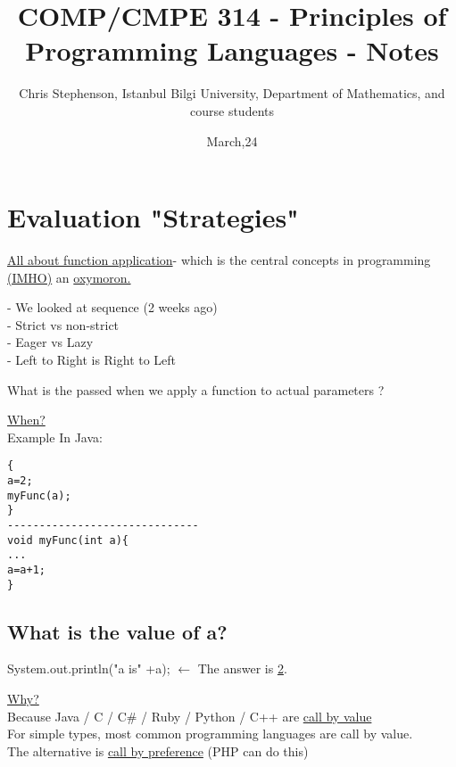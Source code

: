 \documentclass{article}
\begin{document}
\title{COMP/CMPE 314 - Principles of Programming Languages - Notes}
\author{Chris Stephenson, Istanbul Bilgi University, Department of Mathematics, and course students}
\date{March,24}
\maketitle

\section*{Evaluation "Strategies"}
\begin{flushleft}
\underline{All about function application}- which is the central concepts in programming \underline{(IMHO)} an \underline{oxymoron.} 
\end{flushleft}

\doublespacing
\begin{flushleft}
- We looked at sequence (2 weeks ago)\\
- Strict vs non-strict\\
- Eager vs Lazy\\
- Left to Right is Right to Left\\
\end{flushleft}

\doublespacing
\begin{flushleft}
What is the passed when we apply a function to actual parameters ?
\end{flushleft}

\doublespacing
\begin{flushleft}
\underline{When?}\\
Example In Java: 
\begin{verbatim}
{ 
a=2;
myFunc(a);
}
------------------------------
void myFunc(int a){
...
a=a+1;
}
\end{verbatim}
\end{flushleft}

\subsection*{What is the value of a?}
\begin{flushleft}
System.out.println("a is" +a); $\leftarrow$ The answer is \underline{2}.
\end{flushleft}

\doublespacing
\begin{flushleft}
\underline{Why?}\\
Because Java / C / C\# / Ruby / Python / C++ are \underline{call by value}\\
For simple types, most common programming languages are call by value.\\
The alternative is \underline{call by preference} (PHP can do this)
\end{flushleft}
\end{document}
